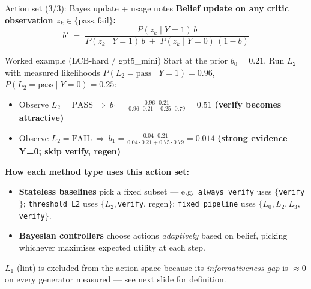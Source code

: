 \documentclass[10pt]{beamer}
\newcommand{\good}[1]{\textcolor{accentGreen}{\textbf{#1}}}
\newcommand{\warn}[1]{\textcolor{accentOrange}{\textbf{#1}}}
\newcommand{\info}[1]{\textcolor{primaryBlue}{\textbf{#1}}}
\begin{document}
\begin{frame}{Action set (3/3): Bayes update + usage notes}
\info{Belief update on any critic observation $z_k \in \{\text{pass},\text{fail}\}$:}
\vspace{-0.1cm}
\[
b' \;=\; \frac{P(z_k\mid Y{=}1)\,b}{P(z_k\mid Y{=}1)\,b \;+\; P(z_k\mid Y{=}0)\,(1-b)}
\]

\begin{exampleblock}{Worked example (LCB-hard / gpt5\_mini)}
\footnotesize
Start at the prior $b_0 = 0.21$. Run $L_2$ with measured likelihoods
$P(L_2{=}\text{pass}\mid Y{=}1) = 0.96$, $P(L_2{=}\text{pass}\mid Y{=}0) = 0.25$:
\begin{itemize}\setlength\itemsep{1pt}
\item Observe $L_2{=}\text{PASS}\ \Rightarrow\ b_1 = \frac{0.96\cdot 0.21}{0.96\cdot 0.21 + 0.25\cdot 0.79} = 0.51$ \quad \good{(verify becomes attractive)}
\item Observe $L_2{=}\text{FAIL}\ \Rightarrow\ b_1 = \frac{0.04\cdot 0.21}{0.04\cdot 0.21 + 0.75\cdot 0.79} = 0.014$ \quad \warn{(strong evidence Y=0; skip verify, regen)}
\end{itemize}
\end{exampleblock}

\vspace{0.05cm}
\textbf{How each method type uses this action set:}
\begin{itemize}\setlength\itemsep{1pt}
\item \textcolor{accentTeal}{\textbf{Stateless baselines}} pick a fixed
subset --- e.g.\ \texttt{always\_verify} uses $\{$\texttt{verify}$\}$;
\texttt{threshold\_L2} uses $\{L_2,$\texttt{verify}, regen$\}$;
\texttt{fixed\_pipeline} uses $\{L_0, L_2, L_3,$\texttt{verify}$\}$.
\item \textcolor{accentPurple}{\textbf{Bayesian controllers}} choose actions
\emph{adaptively} based on belief, picking whichever maximises expected
utility at each step.
\end{itemize}

\textcolor{softGrey}{\scriptsize $L_1$ (lint) is excluded from the action
space because its \emph{informativeness gap} is $\approx 0$ on every generator
measured --- see next slide for definition.}
\end{frame}
\end{document}
